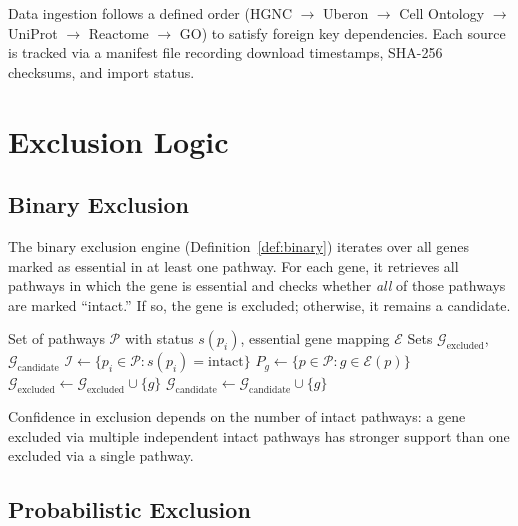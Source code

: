 \documentclass[12pt,a4paper]{article}
\begin{document}
Data ingestion follows a defined order (HGNC $\to$ Uberon $\to$ Cell Ontology $\to$ UniProt $\to$ Reactome $\to$ GO) to satisfy foreign key dependencies. Each source is tracked via a manifest file recording download timestamps, SHA-256 checksums, and import status.

\section{Exclusion Logic}
\label{sec:exclusion}

\subsection{Binary Exclusion}

The binary exclusion engine (Definition~\ref{def:binary}) iterates over all genes marked as essential in at least one pathway. For each gene, it retrieves all pathways in which the gene is essential and checks whether \emph{all} of those pathways are marked ``intact.'' If so, the gene is excluded; otherwise, it remains a candidate.

\begin{algorithm}[H]
\caption{Binary Exclusion Analysis}
\label{alg:binary}
\begin{algorithmic}[1]
\Require Set of pathways $\mathcal{P}$ with status $s(p_i)$, essential gene mapping $\mathcal{E}$
\Ensure Sets $\mathcal{G}_{\text{excluded}}$, $\mathcal{G}_{\text{candidate}}$
\State $\mathcal{I} \gets \{p_i \in \mathcal{P} : s(p_i) = \text{intact}\}$
 
    \State $P_g \gets \{p \in \mathcal{P} : g \in \mathcal{E}(p)\}$ 
        \State $\mathcal{G}_{\text{excluded}} \gets \mathcal{G}_{\text{excluded}} \cup \{g\}$
    \Else
        \State $\mathcal{G}_{\text{candidate}} \gets \mathcal{G}_{\text{candidate}} \cup \{g\}$
    \EndIf
\EndFor
\end{algorithmic}
\end{algorithm}

Confidence in exclusion depends on the number of intact pathways: a gene excluded via multiple independent intact pathways has stronger support than one excluded via a single pathway.

\subsection{Probabilistic Exclusion}
\end{document}
